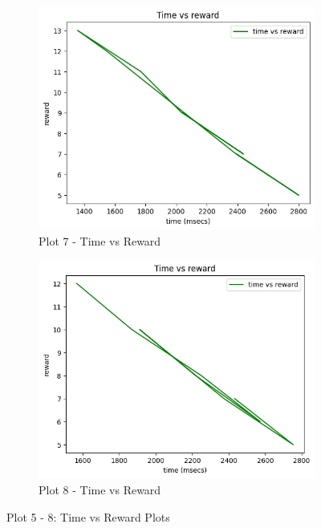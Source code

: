 \documentclass[conference]{IEEEtran}
\begin{document}
\begin{figure}[htbp]
  \vspace{0.5cm}
  
  \begin{subfigure}[t]{0.45\linewidth}
    \centering
    \includegraphics[width=\linewidth]{Plots/tvr 3.jpg}
    \caption{Plot 7 - Time vs Reward}
    \label{fig:figure87}
  \end{subfigure}
  \hfill
  \begin{subfigure}[t]{0.45\linewidth}
    \centering
    \includegraphics[width=\linewidth]{Plots/tvr cc 1.jpg}
    \caption{Plot 8 - Time vs Reward}
    \label{fig:figure86}
  \end{subfigure}
  \caption{Plot 5 - 8: Time vs Reward Plots}
  \label{fig:allfigures}
\end{figure}
 
\end{document}
